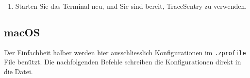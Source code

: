 \documentclass[a4paper,12pt]{report}
\begin{document}
\begin{enumerate}
        \begin{lstlisting}[label={lst:lstlisting-windows-4}]
Copy-Item "$env:TRACE_SENTRY_DIR\ts-daemon.bat" "$env:APPDATA\Microsoft\Windows\Start Menu\Programs\Startup"
        \end{lstlisting}
        Beim nächsten Systemstart wird der Daemon automatisch gestartet.
        Beim ersten Start kann eine Sicherheitswarnung erscheinen, in der Sie eine Checkbox deaktivieren müssen, damit diese in Zukunft nicht mehr erscheint.
        \item Starten Sie das Terminal neu, und Sie sind bereit, TraceSentry zu verwenden.
    \end{enumerate}

    \clearpage

    \subsection{macOS}\label{subsec:macos}
    Der Einfachheit halber werden hier ausschliesslich Konfigurationen im \texttt{.zprofile} File benützt.
    Die nachfolgenden Befehle schreiben die Konfigurationen direkt in die Datei.
\end{document}
